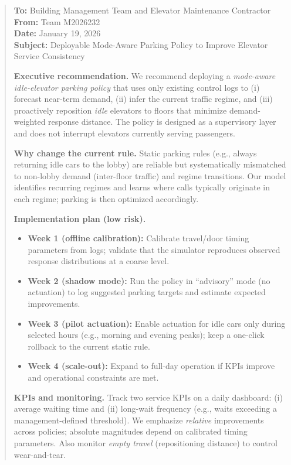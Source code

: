 
\begin{quote}
\noindent
\textbf{To:} Building Management Team and Elevator Maintenance Contractor \\
\textbf{From:} Team M2026232 \\
\textbf{Date:} January 19, 2026 \\
\textbf{Subject:} Deployable Mode-Aware Parking Policy to Improve Elevator Service Consistency

\vspace{0.8em}
\textbf{Executive recommendation.}
We recommend deploying a \emph{mode-aware idle-elevator parking policy} that uses only existing control logs to (i) forecast near-term demand, (ii) infer the current traffic regime, and (iii) proactively reposition \emph{idle} elevators to floors that minimize demand-weighted response distance. The policy is designed as a supervisory layer and does not interrupt elevators currently serving passengers.

\vspace{0.6em}
\textbf{Why change the current rule.}
Static parking rules (e.g., always returning idle cars to the lobby) are reliable but systematically mismatched to non-lobby demand (inter-floor traffic) and regime transitions. Our model identifies recurring regimes and learns where calls typically originate in each regime; parking is then optimized accordingly.

\vspace{0.6em}
\textbf{Implementation plan (low risk).}
\begin{itemize}[leftmargin=1.2em,itemsep=0.25em,topsep=0.25em]
  \item \textbf{Week 1 (offline calibration):} Calibrate travel/door timing parameters from logs; validate that the simulator reproduces observed response distributions at a coarse level.
  \item \textbf{Week 2 (shadow mode):} Run the policy in ``advisory'' mode (no actuation) to log suggested parking targets and estimate expected improvements.
  \item \textbf{Week 3 (pilot actuation):} Enable actuation for idle cars only during selected hours (e.g., morning and evening peaks); keep a one-click rollback to the current static rule.
  \item \textbf{Week 4 (scale-out):} Expand to full-day operation if KPIs improve and operational constraints are met.
\end{itemize}

\vspace{0.6em}
\textbf{KPIs and monitoring.}
Track two service KPIs on a daily dashboard: (i) average waiting time and (ii) long-wait frequency (e.g., waits exceeding a management-defined threshold). We emphasize \emph{relative} improvements across policies; absolute magnitudes depend on calibrated timing parameters. Also monitor \emph{empty travel} (repositioning distance) to control wear-and-tear.


\end{quote}
